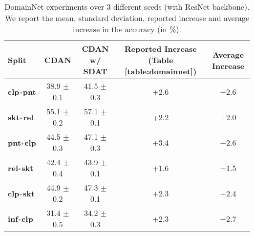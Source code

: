 \documentclass[table,dvipsnames]{article}
\newcommand{\veryshortarrow}[1][3pt]{\mathrel{\hbox{\rule[\dimexpr\fontdimen22\textfont2-.2pt\relax]{#1}{.4pt}}\mkern-4mu\hbox{\usefont{U}{lasy}{m}{n}\symbol{41}}}} \newcommand{\cmark}{\ding{51}}\newcommand{\xmark}{\ding{55}}\usepackage{amssymb}\usepackage{pifont}\usepackage[hyphens]{url}
\theoremstyle{plain}
\theoremstyle{definition}
\theoremstyle{remark}
\begin{document}
\begin{table*}
    \centering
    \caption{ {DomainNet experiments over 3 different seeds (with ResNet backbone). We report the mean, standard deviation,  reported increase and average increase in the accuracy (in \%).}}
    \vskip 0.15in
     \begin{adjustbox}{max width=\columnwidth}
    \begin{tabular}{l|cc|cc}
    \hline
    {Split} &  CDAN & CDAN w/ SDAT & Reported Increase (Table \ref{table:domainnet}) & Average Increase\\
\hline \hline
    \textbf{clp$\veryshortarrow$pnt} & 38.9 $\pm$  0.1 & 41.5 $\pm$ 0.3 & +2.6 & +2.6 \\
    \textbf{skt$\veryshortarrow$rel} & 55.1 $\pm$  0.2 & 57.1 $\pm$  0.1 & +2.2 & +2.0 \\
    \textbf{pnt$\veryshortarrow$clp } & 44.5 $\pm$  0.3 & 47.1 $\pm$  0.3 & +3.4 & +2.6\\
    \textbf{rel$\veryshortarrow$skt } & 42.4 $\pm$  0.4 & 43.9 $\pm$  0.1& +1.6 & +1.5\\
    \textbf{clp$\veryshortarrow$skt } & 44.9 $\pm$  0.2 & 47.3 $\pm$  0.1 & +2.3 & +2.4\\
    \textbf{inf$\veryshortarrow$clp} & 31.4 $\pm$  0.5 & 34.2 $\pm$  0.3 & +2.3 & +2.7\\
    \end{tabular}
    
    \label{tab:seed_exp}
    \end{adjustbox}
\end{table*}
\end{document}
